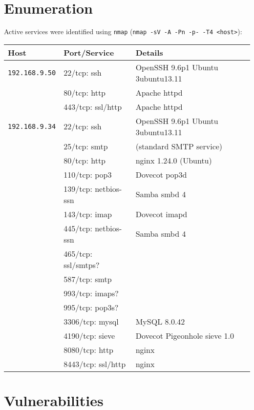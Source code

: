 \documentclass[a4paper,12pt]{article}
\begin{document}
\section{Enumeration}
Active services were identified using \texttt{nmap} (\texttt{nmap -sV -A -Pn -p- -T4 <host>}):
\begin{table}[ht]
    \centering
    \begin{tabular}{lll}
        \toprule
        \rowcolor{gray!20} \textbf{Host} & \textbf{Port/Service} & \textbf{Details} \\
        \midrule
        \texttt{192.168.9.50} 
            & 22/tcp: ssh & OpenSSH 9.6p1 Ubuntu 3ubuntu13.11 \\
            & 80/tcp: http & Apache httpd \\
            & 443/tcp: ssl/http & Apache httpd \\ \hline
        \texttt{192.168.9.34} 
            & 22/tcp: ssh       & OpenSSH 9.6p1 Ubuntu 3ubuntu13.11 \\
            & 25/tcp: smtp      & (standard SMTP service) \\
            & 80/tcp: http      & nginx 1.24.0 (Ubuntu) \\
            & 110/tcp: pop3     & Dovecot pop3d \\
            & 139/tcp: netbios-ssn & Samba smbd 4 \\
            & 143/tcp: imap     & Dovecot imapd \\
            & 445/tcp: netbios-ssn & Samba smbd 4 \\
            & 465/tcp: ssl/smtps? &  \\
            & 587/tcp: smtp     &  \\
            & 993/tcp: imaps?   &  \\
            & 995/tcp: pop3s?   &  \\
            & 3306/tcp: mysql   & MySQL 8.0.42 \\
            & 4190/tcp: sieve   & Dovecot Pigeonhole sieve 1.0 \\
            & 8080/tcp: http    & nginx \\
            & 8443/tcp: ssl/http & nginx \\
        \bottomrule
    \end{tabular}
\end{table}

\clearpage

\section{Vulnerabilities}
\end{document}
